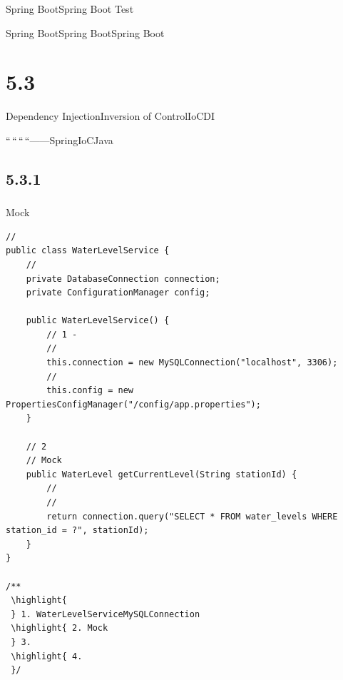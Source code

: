 \hypertarget{section-44}{%
\subsubsection{}\label{section-44}}

\important{}Spring Boot\important{}Spring Boot
Test\important{}\important{}

Spring BootSpring BootSpring Boot

\hypertarget{section-45}{%
\section{5.3}\label{section-45}}

Dependency InjectionInversion of ControlIoCDI

``\,``\,``\,``------SpringIoCJava

\hypertarget{section-46}{%
\subsection{5.3.1}\label{section-46}}

\hypertarget{section-47}{%
\subsubsection{}\label{section-47}}

\important{}\important{}

\important{}Mock\important{}

\begin{lstlisting}[style=java]
// 
public class WaterLevelService {
    // 
    private DatabaseConnection connection;
    private ConfigurationManager config;
    
    public WaterLevelService() {
        // 1 - 
        // 
        this.connection = new MySQLConnection("localhost", 3306);
        // 
        this.config = new PropertiesConfigManager("/config/app.properties");
    }
    
    // 2
    // Mock
    public WaterLevel getCurrentLevel(String stationId) {
        // 
        // 
        return connection.query("SELECT * FROM water_levels WHERE station_id = ?", stationId);
    }
}

/**
 \highlight{ 
 } 1. WaterLevelServiceMySQLConnection
 \highlight{ 2. Mock
 } 3. 
 \highlight{ 4. 
 }/
\end{lstlisting}

\hypertarget{section-48}{%
\subsubsection{}\label{section-48}}

